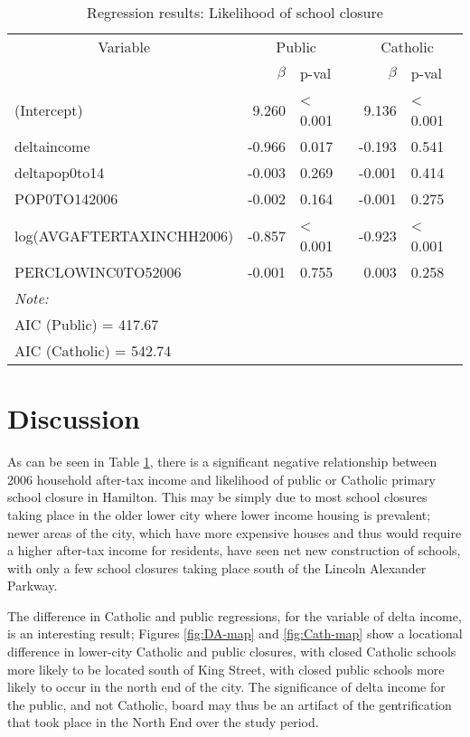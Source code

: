 \documentclass[]{elsarticle} %
\begin{document}
\begin{table}

\caption{\label{tab:probitresults}\label{tab:probitresults} Regression results: Likelihood of school closure}
\centering
\begin{tabular}[t]{lrlrl}
\toprule
\multicolumn{1}{c}{Variable} & \multicolumn{2}{c}{Public} & \multicolumn{2}{c}{Catholic} \\
\cmidrule(l{3pt}r{3pt}){1-1} \cmidrule(l{3pt}r{3pt}){2-3} \cmidrule(l{3pt}r{3pt}){4-5}
  & $\beta$ & p-val & $\beta$ & p-val\\
\midrule
(Intercept) & 9.260 & < 0.001 & 9.136 & < 0.001\\
deltaincome & -0.966 & 0.017 & -0.193 & 0.541\\
deltapop0to14 & -0.003 & 0.269 & -0.001 & 0.414\\
POP0TO142006 & -0.002 & 0.164 & -0.001 & 0.275\\
log(AVGAFTERTAXINCHH2006) & -0.857 & < 0.001 & -0.923 & < 0.001\\
\addlinespace
PERCLOWINC0TO52006 & -0.001 & 0.755 & 0.003 & 0.258\\
\bottomrule
\multicolumn{5}{l}{\textit{Note: }}\\
\multicolumn{5}{l}{AIC (Public) =  417.67}\\
\multicolumn{5}{l}{AIC (Catholic) =  542.74}\\
\end{tabular}
\end{table}

\hypertarget{discussion}{%
\section{Discussion}\label{discussion}}

As can be seen in Table \ref{tab:probitresults}, there is a significant
negative relationship between 2006 household after-tax income and
likelihood of public or Catholic primary school closure in Hamilton.
This may be simply due to most school closures taking place in the older
lower city where lower income housing is prevalent; newer areas of the
city, which have more expensive houses and thus would require a higher
after-tax income for residents, have seen net new construction of
schools, with only a few school closures taking place south of the
Lincoln Alexander Parkway.

The difference in Catholic and public regressions, for the variable of
delta income, is an interesting result; Figures \ref{fig:DA-map} and
\ref{fig:Cath-map} show a locational difference in lower-city Catholic
and public closures, with closed Catholic schools more likely to be
located south of King Street, with closed public schools more likely to
occur in the north end of the city. The significance of delta income for
the public, and not Catholic, board may thus be an artifact of the
gentrification that took place in the North End over the study period.
\end{document}
